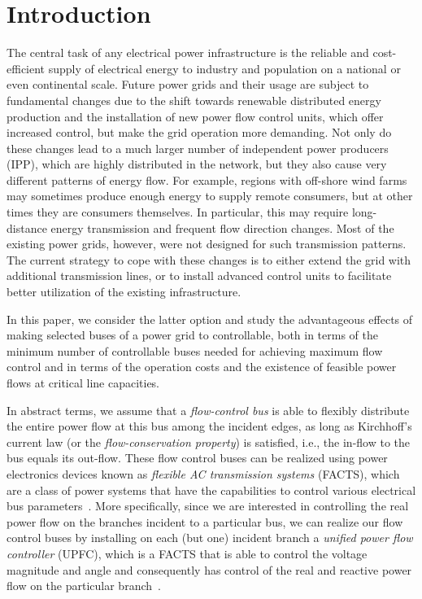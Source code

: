\documentclass{article}[11pt,a4paper]
\begin{document}
\section{Introduction}
\label{sec:introduction}
The central task of any electrical power infrastructure is the reliable and cost-efficient supply of electrical energy to industry and population on a national or even continental scale. 
Future power grids and their usage are subject to fundamental changes due to the shift towards renewable distributed energy production and the installation of new power flow control units, which offer increased control, but make the grid operation more demanding.
Not only do these changes lead to a much larger number of independent power producers (IPP), which are highly distributed in the network, but they also cause very different patterns of energy flow. 
For example, regions with off-shore wind farms may sometimes produce enough energy to supply remote consumers, but at other times they are consumers themselves.
In particular, this may require long-distance energy transmission and frequent flow direction changes. Most of the existing power grids, however, were not designed for such transmission patterns. The current strategy to cope with these changes is to either extend the grid with additional transmission lines, or to install advanced control units to facilitate better utilization of the existing infrastructure.

In this paper, we consider the latter option and study the advantageous effects of making selected buses of a power grid to controllable, both in terms of the minimum number of controllable buses needed for achieving maximum flow control and in terms of the operation costs and the existence of feasible power flows at critical line capacities. 

In abstract terms, we assume that a \emph{flow-control bus} is able to flexibly distribute the entire power flow at this bus among the incident edges, as long as Kirchhoff's current law (or the \emph{flow-conservation property}) is satisfied, i.e., the in-flow to the bus equals its out-flow.
These flow control buses can be realized using power electronics devices known as \emph{flexible AC transmission systems} (FACTS), which are a class of power systems that have the capabilities to control various electrical bus parameters~\cite{Hingorani1993a,gh-ufact-00}. 
More specifically, since we are interested in controlling the real power flow on the branches incident to a particular bus, we can realize our flow control buses by installing on each (but one) incident branch a \emph{unified power flow controller} (UPFC), which is a FACTS that is able to control the voltage magnitude and angle and consequently has control of the real and reactive power flow on the particular branch~\cite{Noroozian1997,gh-ufact-00}.
\end{document}
